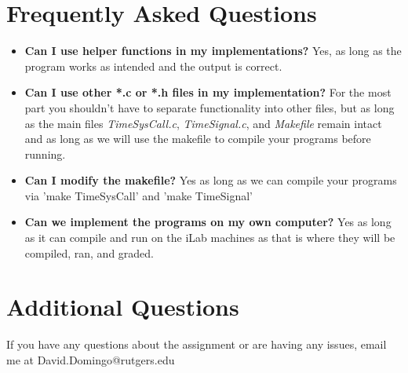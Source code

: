 \documentclass{article}
\begin{document}
\section*{Frequently Asked Questions}
\begin{itemize}
\item \textbf{Can I use helper functions in my implementations?} Yes, as long as the program works as intended and the output is correct. 
\item \textbf{Can I use other *.c or *.h files in my implementation?} For the most part you shouldn't have to separate functionality into other files, but as long as the main files \textit{TimeSysCall.c}, \textit{TimeSignal.c}, and \textit{Makefile} remain intact and as long as we will use the makefile to compile your programs before running.
\item \textbf{Can I modify the makefile?} Yes as long as we can compile your programs via 'make TimeSysCall' and 'make TimeSignal' 
\item \textbf{Can we implement the programs on my own computer?} Yes as long as it can compile and run on the iLab machines as that is where they will be compiled, ran, and graded. 
\end{itemize}

\section*{Additional Questions}
If you have any questions about the assignment or are having any issues, email me at David.Domingo@rutgers.edu
\end{document}
